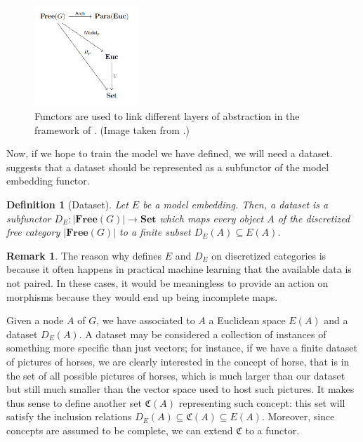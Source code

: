 \documentclass[11pt,a4paper,openright,twoside]{report}
\newcounter{mycounter}
\theoremstyle{plain}
\newtheorem{definition}[mycounter]{Definition}
\theoremstyle{definition}
\newtheorem{remark}[mycounter]{Remark}
\begin{document}
\begin{figure}[h]
  \begin{center}
    \includegraphics[width=0.35\textwidth]{figures/layers_of_abstraction.png}     
    \caption[Layers of abstraction]{Functors are used to link different layers of abstraction in the framework of \cite{gavranovic2019compositional}. (Image taken from \cite{gavranovic2019compositional}.)}
    \label{fig: layers}
  \end{center}
\end{figure}

Now, if we hope to train the model we have defined, we will need a dataset. \cite{gavranovic2019compositional} suggests that a dataset should be represented as a subfunctor of the model embedding functor.

\begin{definition}[Dataset]
  Let $E$ be a model embedding. Then, a dataset is a subfunctor $D_E: |\mathbf{Free}(G)| \to \mathbf{Set}$ which maps every object $A$ of the discretized free category $|\mathbf{Free}(G)|$ to a finite subset $D_E(A) \subseteq E(A)$.
\end{definition}

\begin{remark}
  \label{rem: discretized}
  The reason why \cite{gavranovic2019compositional} defines $E$ and $D_E$ on discretized categories is because it often happens in practical machine learning that the available data is not paired. In these cases, it would be meaningless to provide an action on morphisms because they would end up being incomplete maps.
\end{remark}

Given a node $A$ of $G$, we have associated to $A$ a Euclidean space $E(A)$ and a dataset $D_E(A)$. A dataset may be considered a collection of instances of something more specific than just vectors; for instance, if we have a finite dataset of pictures of horses, we are clearly interested in the concept of horse, that is in the set of all possible pictures of horses, which is much larger than our dataset but still much smaller than the vector space used to host such pictures. It makes thus sense to define another set $\mathfrak{C}(A)$ representing such concept: this set will satisfy the inclusion relations $D_E(A) \subseteq \mathfrak{C}(A) \subseteq E(A)$. Moreover, since concepts are assumed to be complete, we can extend $\mathfrak{C}$ to a functor.
\end{document}
